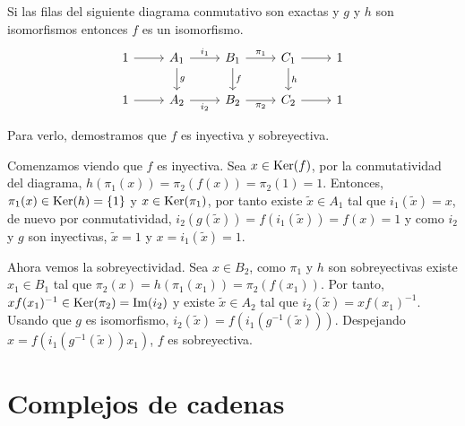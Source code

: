 \begin{proposicion}\label{prop:sflem}
	Si las filas del siguiente diagrama conmutativo son exactas y $g$ y $h$ son isomorfismos entonces $f$ es un isomorfismo.
	\[\begin{tikzcd}
		1 & {A_1} & {B_1} & {C_1} & 1 \\
		1 & {A_2} & {B_2} & {C_2} & 1
		\arrow["g", from=1-2, to=2-2]
		\arrow["{i_1}", from=1-2, to=1-3]
		\arrow["{\pi_1}", from=1-3, to=1-4]
		\arrow["f", from=1-3, to=2-3]
		\arrow["{i_2}"', from=2-2, to=2-3]
		\arrow["{\pi_2}"', from=2-3, to=2-4]
		\arrow["h", from=1-4, to=2-4]
		\arrow[from=1-4, to=1-5]
		\arrow[from=2-1, to=2-2]
		\arrow[from=1-1, to=1-2]
		\arrow[from=2-4, to=2-5]
	\end{tikzcd}\]
	\begin{demostracion}
		Para verlo, demostramos que $f$ es inyectiva y sobreyectiva.
		
		Comenzamos viendo que $f$ es inyectiva. Sea $x\in \operatorname{Ker}(f)$, por la conmutatividad del diagrama, $h(\pi_1(x))=\pi_2(f(x)) = \pi_2(1) = 1$. Entonces, $\pi_1(x)\in \operatorname{Ker}(h) = \{1\}$ y $x\in \operatorname{Ker}(\pi_1)$, por tanto existe $\tilde x\in A_1$ tal que $i_1(\tilde x)=x$, de nuevo por conmutatividad, $i_2(g(\tilde x))=f(i_1(\tilde x))=f(x)=1$ y como $i_2$ y $g$ son inyectivas, $\tilde x = 1$ y $x = i_1(\tilde x)=1$.
		
		Ahora vemos la sobreyectividad. Sea $x\in B_2$, como $\pi_1$ y $h$ son sobreyectivas existe $ x_1\in B_1$ tal que $\pi_2(x)=h(\pi_1(x_1)) = \pi_2(f(x_1))$. Por tanto, $x f(x_1)^{-1} \in \operatorname{Ker}(\pi_2)= \operatorname{Im}(i_2)$ y existe $\tilde x\in A_2$ tal que $i_2(\tilde x)=x f(x_1)^{-1}$. Usando que $g$ es isomorfismo, $i_2(\tilde x) = f(i_1(g^{-1}(\tilde x)))$. Despejando $x = f(i_1(g^{-1}(\tilde x)) x_1)$, $f$ es sobreyectiva.
	\end{demostracion}
\end{proposicion}



\section{Complejos de cadenas}
	

